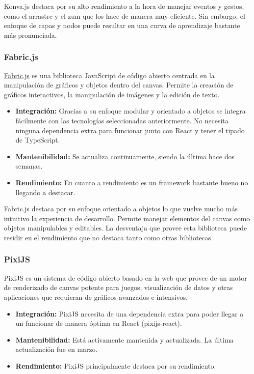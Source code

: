 Konva.js destaca por su alto rendimiento a la hora de manejar eventos y gestos, como el arrastre y el zum que los hace de manera muy eficiente. Sin embargo, el enfoque de capas y nodos puede resultar en una curva de aprendizaje bastante más pronunciada.

\subsubsection{Fabric.js}

\href{http://fabricjs.com/}{Fabric.js} es una biblioteca JavaScript de código abierto centrada en la manipulación de gráficos y objetos dentro del canvas. Permite la creación de gráficos interactivos, la manipulación de imágenes y la edición de texto.

\begin{itemize}
    \item[\esp] \textbf{Integración:} Gracias a su enfoque modular y orientado a objetos se integra fácilmente con las tecnologías seleccionadas anteriormente. No necesita ninguna dependencia extra para funcionar junto con React y tener el tipado de TypeScript.
    \item[\bien] \textbf{Mantenibilidad:} Se actualiza continuamente, siendo la última hace dos semanas.
    \item[\bien] \textbf{Rendimiento:} En cuanto a rendimiento es un framework bastante bueno no llegando a destacar.
\end{itemize}

Fabric.js destaca por su enfoque orientado a objetos lo que vuelve mucho más intuitivo la experiencia de desarrollo. Permite manejar elementos del canvas como objetos manipulables y editables. La desventaja que provee esta biblioteca puede residir en el rendimiento que no destaca tanto como otras bibliotecas.

\subsubsection{PixiJS}

PixiJS es un sistema de código abierto basado en la web que provee de un motor de renderizado de canvas potente para juegos, visualización de datos y otras aplicaciones que requieran de gráficos avanzados e intensivos.

\begin{itemize}
    \item[\regular] \textbf{Integración:} PixiJS necesita de una dependencia extra para poder llegar a un funcionar de manera óptima en React (pixijs-react).
    \item[\bien] \textbf{Mantenibilidad:} Está activamente mantenida y actualizada. La última actualización fue en marzo.
    \item[\esp] \textbf{Rendimiento:} PixiJS principalmente destaca por su rendimiento.
\end{itemize}

